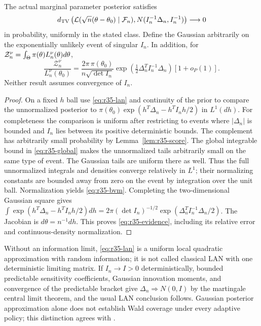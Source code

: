 \begin{theorem}\label{thm:r35-bvm}
The actual marginal parameter posterior satisfies
\begin{equation}\label{eq:r35-bvm}
 d_{\mathrm{TV}}\left(\mathcal L(\sqrt n(\theta-\theta_0)\mid\mathcal F_n),
            N(I_n^{-1}\Delta_n,I_n^{-1})\right)\longrightarrow0
\end{equation}
in probability, uniformly in the stated class. Define the Gaussian arbitrarily on the exponentially unlikely event of singular $I_n$.
In addition, for $\mathcal Z_n^\nu=\int_\Theta\pi(\theta)L_n^\nu(\theta)d\theta$,
\begin{equation}\label{eq:r35-evidence}
 \frac{\mathcal Z_n^\nu}{L_n^\nu(\theta_0)}
 =\frac{2\pi\,\pi(\theta_0)}{n\sqrt{\det I_n}}
       \exp\left(\tfrac12\Delta_n^TI_n^{-1}\Delta_n\right)[1+o_P(1)].
\end{equation}
Neither result assumes convergence of $I_n$.
\end{theorem}
\begin{proof}
On a fixed $h$ ball use \eqref{eq:r35-lan} and continuity of the prior to compare the unnormalized posterior to
$\pi(\theta_0)\exp(h^T\Delta_n-h^TI_nh/2)$ in $L^1(dh)$.
For completeness the comparison is uniform after restricting to events where $|\Delta_n|$ is bounded and $I_n$ lies between its positive deterministic bounds. The complement has arbitrarily small probability by Lemma~\ref{lem:r35-score}. The global integrable bound in \eqref{eq:r35-global} makes the unnormalized tails arbitrarily small on the same type of event. The Gaussian tails are uniform there as well. Thus the full unnormalized integrals and densities converge relatively in $L^1$; their normalizing constants are bounded away from zero on the event by integration over the unit ball. Normalization yields \eqref{eq:r35-bvm}.
Completing the two-dimensional Gaussian square gives
$\int\exp(h^T\Delta_n-h^TI_nh/2)dh=2\pi(\det I_n)^{-1/2}\exp(\Delta_n^TI_n^{-1}\Delta_n/2)$.
The Jacobian is $d\theta=n^{-1}dh$. This proves \eqref{eq:r35-evidence}, including its relative error and continuous-density normalization.
\end{proof}

\begin{remark}
Without an information limit, \eqref{eq:r35-lan} is a uniform local quadratic approximation with random information; it is not called classical LAN with one deterministic limiting matrix. If $I_n\to I>0$ deterministically, bounded predictable sensitivity coefficients, Gaussian innovation moments, and convergence of the predictable bracket give $\Delta_n\Rightarrow N(0,I)$ by the martingale central limit theorem, and the usual LAN conclusion follows. Gaussian posterior approximation alone does not establish Wald coverage under every adaptive policy; this distinction agrees with \cite{DNJ}.
\end{remark}

